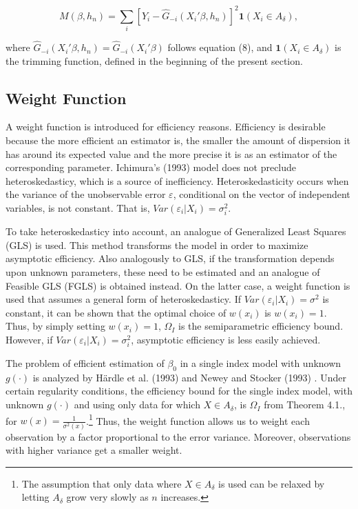 \documentclass[a4paper]{article}
\begin{document}
\begin{equation}
M(\beta, h_n) = \sum_i \left[ Y_i - \hat{G}_{-i}(X_i'\beta, h_n) \right]^2\mathbf{1}{(X_i \in A_\delta)},
\end{equation}

where $\hat{G}_{-i}(X_i'\beta, h_n) = \hat{G}_{-i}(X_i'\beta)$ follows equation (8), and $\mathbf{1}{(X_i \in A_\delta)}$ is the trimming function, defined in the beginning of the present section.

\subsection{Weight Function} %
\label{sub:Weight Function}

A weight function is introduced for efficiency reasons. Efficiency is desirable because the more efficient an estimator is, the smaller the amount of dispersion it has around its expected value and the more precise it is as an estimator of the corresponding parameter. Ichimura's (1993) \cite{[6]} model does not preclude heteroskedasticy, which is a source of inefficiency.  Heteroskedasticity occurs when the variance of the unobservable error $\varepsilon$, conditional on  the vector of independent variables, is not constant. That is, $Var(\varepsilon_i|X_i) = \sigma_i^2$.  

To take heteroskedasticy into account, an analogue of Generalized Least Squares (GLS) is used. This method transforms the model in order to maximize asymptotic efficiency. Also analogously to GLS, if the transformation depends upon unknown parameters, these need to be estimated and an analogue of Feasible GLS (FGLS) is obtained instead. On the latter case, a weight function is used that assumes a general form of heteroskedasticy.
If $Var(\varepsilon_i|X_i) = \sigma^2$ is constant, it can be shown that the optimal choice of $w(x_i)$ is $w(x_i)=1$. Thus, by simply setting $w(x_i)=1$, $\Omega_I$ is the semiparametric efficiency bound. However, if $Var(\varepsilon_i|X_i) = \sigma_i^2$, asymptotic efficiency is less easily achieved.  

The problem of efficient estimation of $\beta_0$ in a single index model with unknown $g(\cdot)$ is analyzed by H{\"a}rdle et al. (1993) \cite{[18]} and Newey and Stocker (1993) \cite{[19]}. Under certain regularity conditions, the efficiency bound for the single index model, with unknown $g(\cdot)$ and using only data for which $X \in A_{\delta}$, is $\Omega_I$ from Theorem 4.1., for $w(x) = \frac{1}{\sigma^2(x)}$.\footnote{The assumption that only data where  $X \in A_{\delta}$ is used can be relaxed by letting $A_\delta$ grow very slowly as $n$ increases.} Thus, the weight function allows us to weight each observation by a factor proportional to the error variance. Moreover, observations with higher variance get a smaller weight. 
\end{document}
